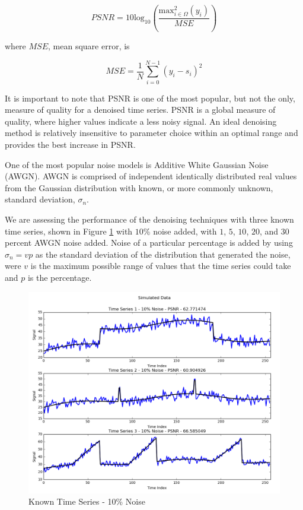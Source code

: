 \documentclass[11pt]{article}
\theoremstyle{definition}
\begin{document}
\begin{displaymath}
PSNR = 10 \mathrm{log} _{10} \left( \frac{\mathrm{max} _{i \in \Omega} ^2 \left( y_i \right)}{MSE} \right)
\end{displaymath}

where $MSE$, mean square error, is

\begin{displaymath}
MSE = \frac{1}{N} \sum _{i = 0} ^{N - 1} \left( y_i - s_i \right) ^2
\end{displaymath}

It is important to note that PSNR is one of the most popular, but not the only, measure of quality for a denoised time series. PSNR is a global measure of quality, where higher values indicate a less noisy signal. An ideal denoising method is relatively insensitive to parameter choice within an optimal range and provides the best increase in PSNR.

One of the most popular noise models is Additive White Gaussian Noise (AWGN). AWGN is comprised of independent identically distributed real values from the Gaussian distribution with known, or more commonly unknown, standard deviation, $\sigma_n$. 

We are assessing the performance of the denoising techniques with three known time series, shown in Figure \ref{signalscompare} with $10$\% noise added, with $1$, $5$, $10$, $20$, and $30$ percent AWGN noise added. Noise of a particular percentage is added by using $\sigma_n = v p$ as the standard deviation of the distribution that generated the noise, were $v$ is the maximum possible range of values that the time series could take and $p$ is the percentage.

\begin{figure}
\centering
\includegraphics[width = 0.65 \textwidth]{SignalsCompare.png}
\caption{Known Time Series - 10\% Noise}
\label{signalscompare}
\end{figure}
\end{document}

